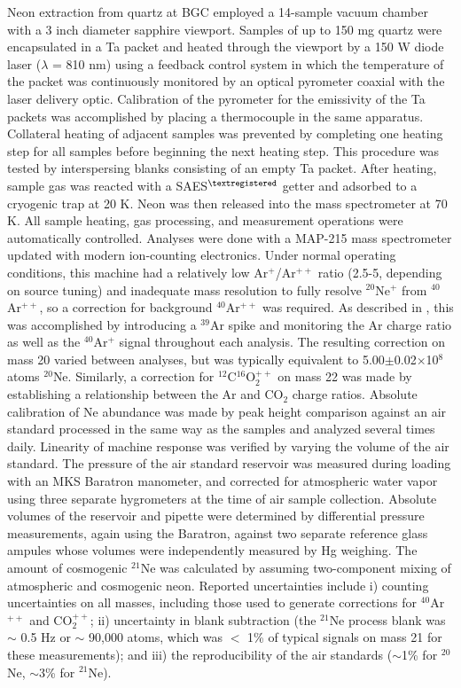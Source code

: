 \documentclass[authoryear,review,12pt]{elsarticle}
\begin{document}
Neon extraction from quartz at BGC employed a 14-sample vacuum chamber
with a 3 inch diameter sapphire viewport. Samples of up to 150 mg
quartz were encapsulated in a Ta packet and heated through the
viewport by a 150 W diode laser ($\lambda$ = 810 nm) using a feedback
control system in which the temperature of the packet was continuously
monitored by an optical pyrometer coaxial with the laser delivery
optic. Calibration of the pyrometer for the emissivity of the Ta
packets was accomplished by placing a thermocouple in the same
apparatus. Collateral heating of adjacent samples was prevented by
completing one heating step for all samples before beginning the next
heating step. This procedure was tested by interspersing blanks
consisting of an empty Ta packet. After heating, sample gas was
reacted with a SAES$^{\tiny\textregistered}$ getter and adsorbed to a
cryogenic trap at 20 K. Neon was then released into the mass
spectrometer at 70 K. All sample heating, gas processing, and
measurement operations were automatically controlled.  Analyses were
done with a MAP-215 mass spectrometer updated with modern ion-counting
electronics. Under normal operating conditions, this machine had a
relatively low Ar$^{+}$/Ar$^{++}$ ratio (2.5-5, depending on source
tuning) and inadequate mass resolution to fully resolve
$^{20}$Ne$^{+}$ from $^{40}$Ar$^{++}$, so a correction for background
$^{40}$Ar$^{++}$ was required. As described in \citet{balco2009a},
this was accomplished by introducing a $^{39}$Ar spike and monitoring
the Ar charge ratio as well as the $^{40}$Ar$^{+}$ signal throughout
each analysis.  The resulting correction on mass 20 varied between
analyses, but was typically equivalent to
5.00$\pm$0.02$\times$10$^{8}$ atoms $^{20}$Ne.  Similarly, a
correction for $^{12}$C$^{16}$O$_{2}^{++}$ on mass 22 was made by
establishing a relationship between the Ar and CO$_{2}$ charge ratios.
Absolute calibration of Ne abundance was made by peak height
comparison against an air standard processed in the same way as the
samples and analyzed several times daily.  Linearity of machine
response was verified by varying the volume of the air standard.  The
pressure of the air standard reservoir was measured during loading
with an MKS Baratron manometer, and corrected for atmospheric water
vapor using three separate hygrometers at the time of air sample
collection.  Absolute volumes of the reservoir and pipette were
determined by differential pressure measurements, again using the
Baratron, against two separate reference glass ampules whose volumes
were independently measured by Hg weighing. The amount of cosmogenic
$^{21}$Ne was calculated by assuming two-component mixing of
atmospheric and cosmogenic neon.  Reported uncertainties include i)
counting uncertainties on all masses, including those used to generate
corrections for $^{40}$Ar$^{++}$ and CO$_{2}^{++}$; ii) uncertainty in
blank subtraction (the $^{21}$Ne process blank was $\sim$ 0.5 Hz or
$\sim$ 90,000 atoms, which was $<$ 1\% of typical signals on mass 21
for these measurements); and iii) the reproducibility of the air
standards ($\sim$1\% for $^{20}$Ne, $\sim$3\% for $^{21}$Ne).
\end{document}
